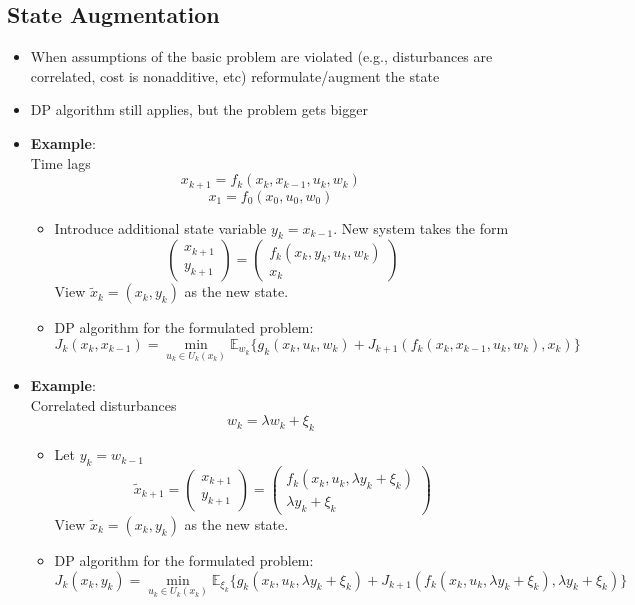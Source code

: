 \subsection{State Augmentation}
\begin{itemize}
    \item When assumptions of the basic problem are violated (e.g., disturbances are correlated, cost is nonadditive, etc) reformulate/augment the state
    \item DP algorithm still applies, but the problem gets bigger
    \item \textbf{Example}: \\Time lags
    \[
        x_{k+1} = f_k(x_k,x_{k-1},u_k,w_k)
    \]
    \[
        x_1 = f_0(x_0,u_0,w_0)
    \]
    \begin{itemize}
        \item Introduce additional state variable $y_k=x_{k-1}$. New system takes the form
        \[
            \left(\begin{array}{cc} x_{k+1} \\ y_{k+1} \end{array}\right) = \left(\begin{array}{cc} f_k(x_k,y_k, u_k,w_k) \\ x_k \end{array}\right)
        \]
        View $\tilde{x}_k = (x_k,y_k)$ as the new state.
        \item DP algorithm for the formulated problem:
        \[
            J_k(x_k,x_{k-1}) = \min_{u_k\in U_k(x_k)} \mathbb{E}_{w_k} \{g_k(x_k,u_k,w_k) + J_{k+1}(f_k(x_k,x_{k-1}, u_k,w_k),x_k)\}
        \]
    \end{itemize}
    \item \textbf{Example}: \\Correlated disturbances
    \[
        w_k = \lambda w_k + \xi _k
    \]
    \begin{itemize}
        \item Let $y_k=w_{k-1}$
        \[
            \tilde{x}_{k+1} = \left(\begin{array}{cc} x_{k+1} \\ y_{k+1} \end{array}\right) = \left(\begin{array}{cc} f_k(x_k,u_k,\lambda y_k + \xi_k) \\ \lambda y_k + \xi_k \end{array}\right)
        \]
        View $\tilde{x}_k = (x_k,y_k)$ as the new state.
        \item DP algorithm for the formulated problem:
        \[
            J_k(x_k,y_k) = \min_{u_k\in U_k(x_k)} \mathbb{E}_{\xi_k} \{g_k(x_k,u_k,\lambda y_k + \xi_k) + J_{k+1}(f_k(x_k,u_k,\lambda y_k + \xi_k),\lambda y_k + \xi_k)\}
        \]
    \end{itemize}
\end{itemize}